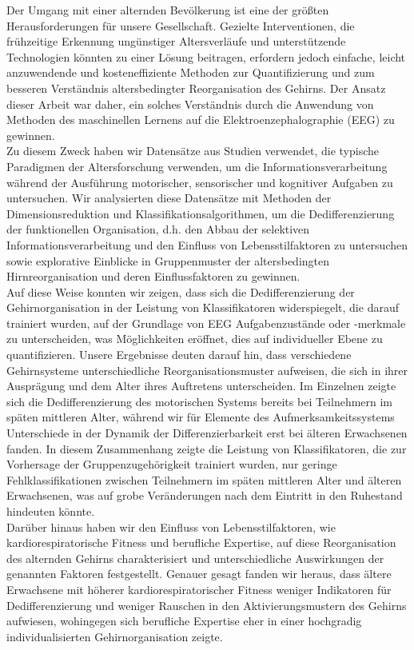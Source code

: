 Der Umgang mit einer alternden Bevölkerung ist eine der größten Herausforderungen für unsere Gesellschaft. Gezielte Interventionen, die frühzeitige Erkennung ungünstiger Altersverläufe und unterstützende Technologien könnten zu einer Lösung beitragen, erfordern jedoch einfache, leicht anzuwendende und kosteneffiziente Methoden zur Quantifizierung und zum besseren Verständnis altersbedingter Reorganisation des Gehirns. Der Ansatz dieser Arbeit war daher, ein solches Verständnis durch die Anwendung von Methoden des maschinellen Lernens auf die Elektroenzephalographie (EEG) zu gewinnen.\\
Zu diesem Zweck haben wir Datensätze aus Studien verwendet, die typische Paradigmen der Altersforschung verwenden, um die Informationsverarbeitung während der Ausführung motorischer, sensorischer und kognitiver Aufgaben zu untersuchen. Wir analysierten diese Datensätze mit Methoden der Dimensionsreduktion und Klassifikationsalgorithmen, um die Dedifferenzierung der funktionellen Organisation, d.h. den Abbau der selektiven Informationsverarbeitung und den Einfluss von Lebensstilfaktoren zu untersuchen sowie explorative Einblicke in Gruppenmuster der altersbedingten Hirnreorganisation und deren Einflussfaktoren zu gewinnen.\\
Auf diese Weise konnten wir zeigen, dass sich die Dedifferenzierung der Gehirnorganisation in der Leistung von Klassifikatoren widerspiegelt, die darauf trainiert wurden, auf der Grundlage von EEG Aufgabenzustände oder -merkmale zu unterscheiden, was Möglichkeiten eröffnet, dies auf individueller Ebene zu quantifizieren. Unsere Ergebnisse deuten darauf hin, dass verschiedene Gehirnsysteme unterschiedliche Reorganisationsmuster aufweisen, die sich in ihrer Ausprägung und dem Alter ihres Auftretens unterscheiden. Im Einzelnen zeigte sich die Dedifferenzierung des motorischen Systems bereits bei Teilnehmern im späten mittleren Alter, während wir für Elemente des Aufmerksamkeitssystems Unterschiede in der Dynamik der Differenzierbarkeit erst bei älteren Erwachsenen fanden. In diesem Zusammenhang zeigte die Leistung von Klassifikatoren, die zur Vorhersage der Gruppenzugehörigkeit trainiert wurden, nur geringe Fehlklassifikationen zwischen Teilnehmern im späten mittleren Alter und älteren Erwachsenen, was auf grobe Veränderungen nach dem Eintritt in den Ruhestand hindeuten könnte.\\
Darüber hinaus haben wir den Einfluss von Lebensstilfaktoren, wie kardiorespiratorische Fitness und berufliche Expertise, auf diese Reorganisation des alternden Gehirns charakterisiert und unterschiedliche Auswirkungen der genannten Faktoren festgestellt. Genauer gesagt fanden wir heraus, dass ältere Erwachsene mit höherer kardiorespiratorischer Fitness weniger Indikatoren für Dedifferenzierung und weniger Rauschen in den Aktivierungsmustern des Gehirns aufwiesen, wohingegen sich berufliche Expertise eher in einer hochgradig individualisierten Gehirnorganisation zeigte.\\
